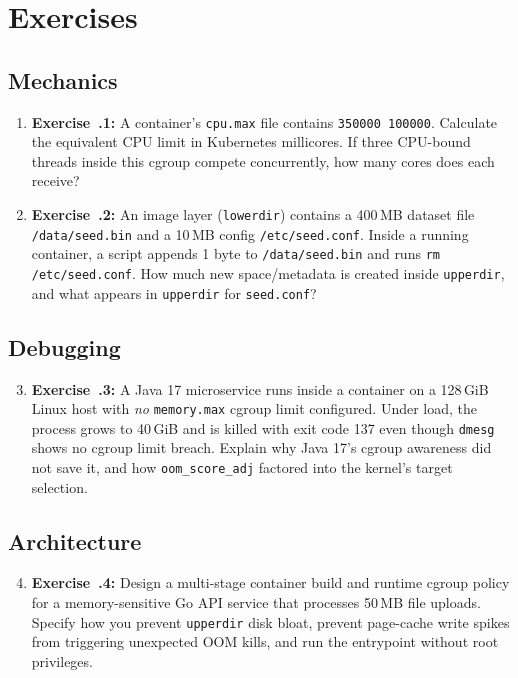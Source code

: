 \section{Exercises}

\subsection{Mechanics}
\begin{enumerate}[leftmargin=18pt]
  \item \textbf{Exercise~\thechapter.1:} A container's \texttt{cpu.max} file contains \texttt{350000 100000}. Calculate the equivalent CPU limit in Kubernetes millicores. If three CPU-bound threads inside this cgroup compete concurrently, how many cores does each receive?
  \item \textbf{Exercise~\thechapter.2:} An image layer (\texttt{lowerdir}) contains a 400\,MB dataset file \texttt{/data/seed.bin} and a 10\,MB config \texttt{/etc/seed.conf}. Inside a running container, a script appends 1 byte to \texttt{/data/seed.bin} and runs \texttt{rm /etc/seed.conf}. How much new space/metadata is created inside \texttt{upperdir}, and what appears in \texttt{upperdir} for \texttt{seed.conf}?
\end{enumerate}

\subsection{Debugging}
\begin{enumerate}[leftmargin=18pt]
  \setcounter{enumi}{2}
  \item \textbf{Exercise~\thechapter.3:} A Java 17 microservice runs inside a container on a 128\,GiB Linux host with \emph{no} \texttt{memory.max} cgroup limit configured. Under load, the process grows to 40\,GiB and is killed with exit code 137 even though \texttt{dmesg} shows no cgroup limit breach. Explain why Java 17's cgroup awareness did not save it, and how \texttt{oom\_score\_adj} factored into the kernel's target selection.
\end{enumerate}

\subsection{Architecture}
\begin{enumerate}[leftmargin=18pt]
  \setcounter{enumi}{3}
  \item \textbf{Exercise~\thechapter.4:} Design a multi-stage container build and runtime cgroup policy for a memory-sensitive Go API service that processes 50\,MB file uploads. Specify how you prevent \texttt{upperdir} disk bloat, prevent page-cache write spikes from triggering unexpected OOM kills, and run the entrypoint without root privileges.
\end{enumerate}

